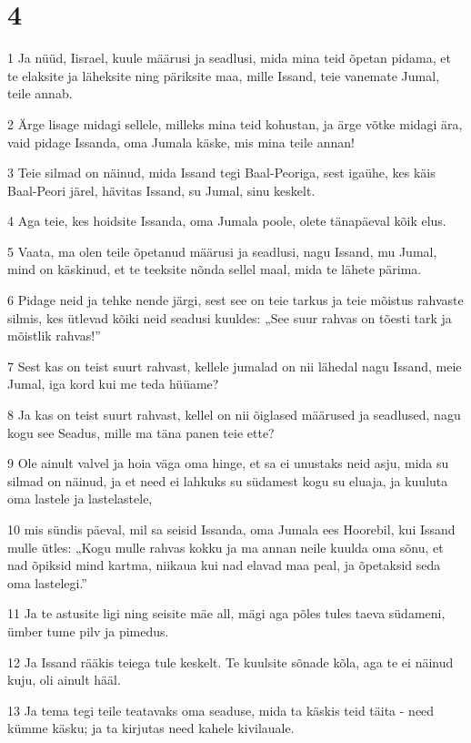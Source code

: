 \chapter{4}

\par 1 Ja nüüd, Iisrael, kuule määrusi ja seadlusi, mida mina teid õpetan pidama, et te elaksite ja läheksite ning päriksite maa, mille Issand, teie vanemate Jumal, teile annab.
\par 2 Ärge lisage midagi sellele, milleks mina teid kohustan, ja ärge võtke midagi ära, vaid pidage Issanda, oma Jumala käske, mis mina teile annan!
\par 3 Teie silmad on näinud, mida Issand tegi Baal-Peoriga, sest igaühe, kes käis Baal-Peori järel, hävitas Issand, su Jumal, sinu keskelt.
\par 4 Aga teie, kes hoidsite Issanda, oma Jumala poole, olete tänapäeval kõik elus.
\par 5 Vaata, ma olen teile õpetanud määrusi ja seadlusi, nagu Issand, mu Jumal, mind on käskinud, et te teeksite nõnda sellel maal, mida te lähete pärima.
\par 6 Pidage neid ja tehke nende järgi, sest see on teie tarkus ja teie mõistus rahvaste silmis, kes ütlevad kõiki neid seadusi kuuldes: „See suur rahvas on tõesti tark ja mõistlik rahvas!”
\par 7 Sest kas on teist suurt rahvast, kellele jumalad on nii lähedal nagu Issand, meie Jumal, iga kord kui me teda hüüame?
\par 8 Ja kas on teist suurt rahvast, kellel on nii õiglased määrused ja seadlused, nagu kogu see Seadus, mille ma täna panen teie ette?
\par 9 Ole ainult valvel ja hoia väga oma hinge, et sa ei unustaks neid asju, mida su silmad on näinud, ja et need ei lahkuks su südamest kogu su eluaja, ja kuuluta oma lastele ja lastelastele,
\par 10 mis sündis päeval, mil sa seisid Issanda, oma Jumala ees Hoorebil, kui Issand mulle ütles: „Kogu mulle rahvas kokku ja ma annan neile kuulda oma sõnu, et nad õpiksid mind kartma, niikaua kui nad elavad maa peal, ja õpetaksid seda oma lastelegi.”
\par 11 Ja te astusite ligi ning seisite mäe all, mägi aga põles tules taeva südameni, ümber tume pilv ja pimedus.
\par 12 Ja Issand rääkis teiega tule keskelt. Te kuulsite sõnade kõla, aga te ei näinud kuju, oli ainult hääl.
\par 13 Ja tema tegi teile teatavaks oma seaduse, mida ta käskis teid täita - need kümme käsku; ja ta kirjutas need kahele kivilauale.
